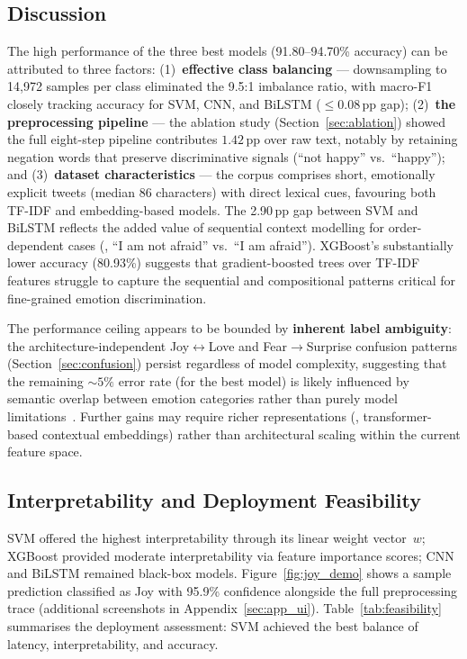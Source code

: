 \subsection{Discussion}
\label{sec:discussion}

The high performance of the three best models (91.80--94.70\% accuracy) can be attributed to three factors:
(1)~\textbf{effective class balancing} --- downsampling to 14,972 samples per class eliminated the 9.5:1 imbalance ratio, with macro-F1 closely tracking accuracy for SVM, CNN, and BiLSTM ($\leq$0.08\,pp gap);
(2)~\textbf{the preprocessing pipeline} --- the ablation study (Section~\ref{sec:ablation}) showed the full eight-step pipeline contributes $1.42$\,pp over raw text, notably by retaining negation words that preserve discriminative signals (``not happy'' vs.\ ``happy''); and
(3)~\textbf{dataset characteristics} --- the corpus comprises short, emotionally explicit tweets (median 86 characters) with direct lexical cues, favouring both TF-IDF and embedding-based models. The 2.90\,pp gap between SVM and BiLSTM reflects the added value of sequential context modelling for order-dependent cases (\eg, ``I am not afraid'' vs.\ ``I am afraid''). XGBoost's substantially lower accuracy (80.93\%) suggests that gradient-boosted trees over TF-IDF features struggle to capture the sequential and compositional patterns critical for fine-grained emotion discrimination.

The performance ceiling appears to be bounded by \textbf{inherent label ambiguity}: the architecture-independent Joy$\leftrightarrow$Love and Fear$\rightarrow$Surprise confusion patterns (Section~\ref{sec:confusion}) persist regardless of model complexity, suggesting that the remaining ${\sim}5\%$ error rate (for the best model) is likely influenced by semantic overlap between emotion categories rather than purely model limitations~\citep{demszky2020goemotions}. Further gains may require richer representations (\eg, transformer-based contextual embeddings) rather than architectural scaling within the current feature space.

\subsection{Interpretability and Deployment Feasibility}
\label{sec:deploy}

SVM offered the highest interpretability through its linear weight vector~$w$; XGBoost provided moderate interpretability via feature importance scores; CNN and BiLSTM remained black-box models. Figure~\ref{fig:joy_demo} shows a sample prediction classified as Joy with 95.9\% confidence alongside the full preprocessing trace (additional screenshots in Appendix~\ref{sec:app_ui}). Table~\ref{tab:feasibility} summarises the deployment assessment: SVM achieved the best balance of latency, interpretability, and accuracy.

